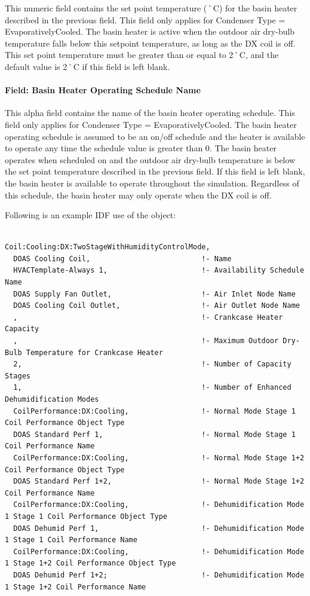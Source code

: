 This numeric field contains the set point temperature (˚C) for the basin heater described in the previous field. This field only applies for Condenser Type = EvaporativelyCooled. The basin heater is active when the outdoor air dry-bulb temperature falls below this setpoint temperature, as long as the DX coil is off. This set point temperature must be greater than or equal to 2˚C, and the default value is 2˚C if this field is left blank.

\paragraph{Field: Basin Heater Operating Schedule Name}\label{field-basin-heater-operating-schedule-name-2-000}

This alpha field contains the name of the basin heater operating schedule. This field only applies for Condenser Type = EvaporativelyCooled. The basin heater operating schedule is assumed to be an on/off schedule and the heater is available to operate any time the schedule value is greater than 0. The basin heater operates when scheduled on and the outdoor air dry-bulb temperature is below the set point temperature described in the previous field. If this field is left blank, the basin heater is available to operate throughout the simulation. Regardless of this schedule, the basin heater may only operate when the DX coil is off.

Following is an example IDF use of the object:

\begin{lstlisting}

Coil:Cooling:DX:TwoStageWithHumidityControlMode,
  DOAS Cooling Coil,                          !- Name
  HVACTemplate-Always 1,                      !- Availability Schedule Name
  DOAS Supply Fan Outlet,                     !- Air Inlet Node Name
  DOAS Cooling Coil Outlet,                   !- Air Outlet Node Name
  ,                                           !- Crankcase Heater Capacity
  ,                                           !- Maximum Outdoor Dry-Bulb Temperature for Crankcase Heater
  2,                                          !- Number of Capacity Stages
  1,                                          !- Number of Enhanced Dehumidification Modes
  CoilPerformance:DX:Cooling,                 !- Normal Mode Stage 1 Coil Performance Object Type
  DOAS Standard Perf 1,                       !- Normal Mode Stage 1 Coil Performance Name
  CoilPerformance:DX:Cooling,                 !- Normal Mode Stage 1+2 Coil Performance Object Type
  DOAS Standard Perf 1+2,                     !- Normal Mode Stage 1+2 Coil Performance Name
  CoilPerformance:DX:Cooling,                 !- Dehumidification Mode 1 Stage 1 Coil Performance Object Type
  DOAS Dehumid Perf 1,                        !- Dehumidification Mode 1 Stage 1 Coil Performance Name
  CoilPerformance:DX:Cooling,                 !- Dehumidification Mode 1 Stage 1+2 Coil Performance Object Type
  DOAS Dehumid Perf 1+2;                      !- Dehumidification Mode 1 Stage 1+2 Coil Performance Name
\end{lstlisting}


